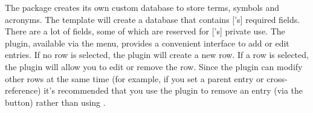    The  package creates its own custom database 
   to store terms, symbols and acronyms. The  template
   will create a database that contains ['s] required 
   fields. There are a lot of fields, some of which are reserved for
   ['s] private use. The  plugin, 
   available via the  menu, provides 
   a convenient interface to add or edit entries. If no row is selected,
   the plugin will create a new row. If a row is selected,
   the plugin will allow you to edit or remove the row. Since the 
    plugin can modify other rows at the same time
   (for example, if you set a parent entry or cross-reference)
   it's recommended that you use the  plugin to remove an
   entry (via the  button) rather than 
   using .

